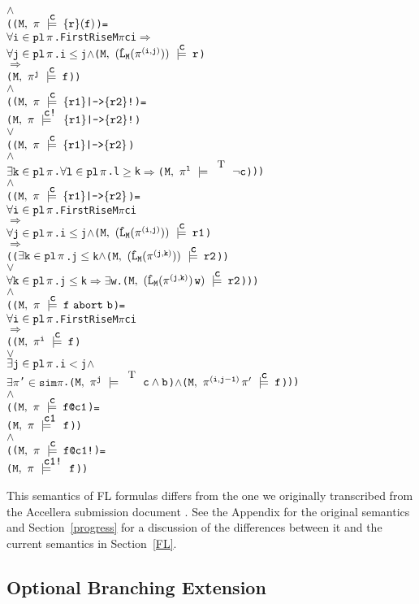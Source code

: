 \documentclass{llncs}
\makeatletter
\newcommand{\And}{\(\wedge\)}
\newcommand{\Or}{\(\vee\)}
\newcommand{\Imp}{\(\Rightarrow\)}
\newcommand{\Exists}{\(\exists\)}
\newcommand{\In}{\(\in\)}
\newcommand{\cat}{\hspace*{0.5mm}}
\newcommand{\pathCat}[2]{#1\hspace*{0.5mm}#2}
\newcommand{\Leq}{\(\leq\)}
\newcommand{\Geq}{\(\geq\)}
\newcommand{\Le}{\(<\)}
\newcommand{\T}{\texttt{\small\rm{T}}}
\renewcommand{\Pi}{\(\pi\)}
\newcommand{\SSem}[4]{(\(\tt{#1,~#2~\models^{\hspace*{-2.3mm}\raisebox{1mm}{\tt#3}}~#4}\))}
\newcommand{\FSem}[4]{(\(\tt{#1,~#2~\models^{\hspace*{-2.3mm}\raisebox{1mm}{\tt#3}}~#4}\))}
\newcommand{\pl}{\texttt{pl}\xspace}
\newcommand{\Sim}{\(\texttt{sim}\xspace\)}
\newcommand{\ResExists}[2]{\(\exists{\tt#1}\in\pl\hspace*{0.5mm}#2\)}
\newcommand{\ResForall}[2]{\(\forall{\tt#1}\in\pl\hspace*{0.5mm}#2\)}
\newcommand{\FBool}[1]{#1}
\newcommand{\bNot}[1]{\neg#1}
\newcommand{\weakClock}[1]{#1}
\newcommand{\strongClock}[1]{#1!}
\newcommand{\restN}[2]{#1^{#2}}
\newcommand{\pathSeg}[2]{#1^{#2}}
\newcommand{\lHat}[1]{\hat{\texttt{L}}_{#1}}
\newcommand{\bAnd}[2]{#1\wedge#2}
\newcommand{\fSuffixImp}[2]{\{#1\}(#2)}
\newcommand{\fStrongImp}[2]{\{#1\}\texttt{|->}\{#2\}\texttt{!}}
\newcommand{\fWeakImp}[2]{\{#1\}\texttt{|->}\{#2\}}
\newcommand{\fAbort}[2]{#1~\texttt{abort}~#2}
\newcommand{\fWeakClock}[2]{#1\texttt{@}#2}
\newcommand{\fStrongClock}[2]{#1\texttt{@}#2\texttt{!}}
\makeatother
\begin{document}
{\begin{alltt}
    {\And}
    ({\FSem{M}{{\pi}}{{\weakClock{c}}}{\fSuffixImp{r}{f}}} = 
      {\ResForall{i}{\pi}}. FirstRise M {\Pi} c i {\Imp}
                {\ResForall{j}{\pi}}. i \Leq j \And \SSem{M}{(\lHat{M} (\pathSeg{\pi}{(i,j)}))}{c}{r}
                          {\Imp}
                          {\FSem{M}{\restN{{\pi}}{j}}{{\weakClock{c}}}{f}})
    {\And}
    ({\FSem{M}{{\pi}}{{\weakClock{c}}}{\fStrongImp{r1}{r2}}} = 
      {\FSem{M}{{\pi}}{{\strongClock{c}}}{\fStrongImp{r1}{r2}}}  
      {\Or}
      ({\FSem{M}{{\pi}}{{\weakClock{c}}}{\fWeakImp{r1}{r2}}} 
       {\And}
       {\ResExists{k}{\pi}}. {\ResForall{l}{\pi}}. l {\Geq} k {\Imp} {\FSem{M}{\restN{{\pi}}{l}}{\weakClock{\T}}{{\FBool{\bNot{c}}}}}))
    {\And}
    ({\FSem{M}{{\pi}}{{\weakClock{c}}}{\fWeakImp{r1}{r2}}} = 
      {\ResForall{i}{\pi}}.  FirstRise M {\Pi} c i
                 {\Imp}
                 {\ResForall{j}{\pi}}. i \Leq j \And \SSem{M}{(\lHat{M} (\pathSeg{\pi}{(i,j)}))}{c}{r1}
                           {\Imp}
                           (({\ResExists{k}{\pi}}. j \Leq k \And \SSem{M}{ (\lHat{M} (\pathSeg{\pi}{(j,k)}))}{c}{r2})
                            {\Or}
                            {\ResForall{k}{\pi}}. j \Leq k \Imp {\Exists}w. \SSem{M}{(\lHat{M} (\pathSeg{\pi}{(j,k)}){\cat}w)}{c}{r2}))
    {\And}
    ({\FSem{M}{{\pi}}{{\weakClock{c}}}{\fAbort{f}{b}}} =
      {\ResForall{i}{\pi}}. FirstRise M {\Pi} c i 
                {\Imp}
                ({\FSem{M}{\restN{{\pi}}{i}}{{\weakClock{c}}}{f}} 
                 {\Or}   
                 {\ResExists{j}{\pi}}. i \Le j \And
                  \Exists{\Pi}'\In\Sim {\Pi}. {\FSem{M}{\restN{{\pi}}{j}}{\weakClock{\T}}{{\FBool{\bAnd{c}{b}}}}} {\And} {\FSem{M}{\pathCat{\pathSeg{\pi}{(i,j-1)}}{{\pi}'}}{{\weakClock{c}}}{f}}))
    {\And}
    ({\FSem{M}{{\pi}}{{\weakClock{c}}}{\fWeakClock{f}{c1}}} =   
      {\FSem{M}{{\pi}}{{\weakClock{c1}}}{f}})
    {\And}
    ({\FSem{M}{{\pi}}{{\weakClock{c}}}{\fStrongClock{f}{c1}}} =   
      {\FSem{M}{{\pi}}{{\strongClock{c1}}}{f}})
\end{alltt}}


This semantics of FL formulas differs from the one we originally transcribed from the Accellera submission document
\cite{Accellera}.
See the Appendix for the original semantics and Section~\ref{progress} for a discussion of the differences
between it and the current semantics in Section~\ref{FL}.



\subsection{Optional Branching Extension}\label{OBE}
\end{document}
